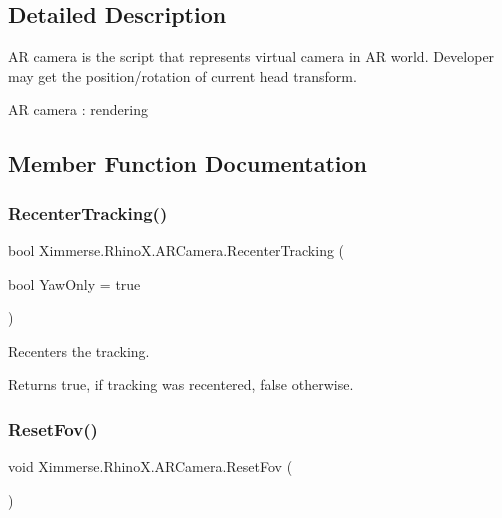 \subsection{Detailed Description}
AR camera is the script that represents virtual camera in AR world. Developer may get the position/rotation of current head transform. 

AR camera \+: rendering 

\subsection{Member Function Documentation}
\mbox{\label{class_ximmerse_1_1_rhino_x_1_1_a_r_camera_a4b8e8609b5b3c5cc7e9722be7e11caff}} 
\subsubsection{\texorpdfstring{Recenter\+Tracking()}{RecenterTracking()}}
{\footnotesize\ttfamily bool Ximmerse.\+Rhino\+X.\+A\+R\+Camera.\+Recenter\+Tracking (\begin{DoxyParamCaption}\item[{bool}]{Yaw\+Only = {\ttfamily true} }\end{DoxyParamCaption})\hspace{0.3cm}{\ttfamily [inline]}}



Recenters the tracking. 

\begin{DoxyReturn}{Returns}
{\ttfamily true}, if tracking was recentered, {\ttfamily false} otherwise.
\end{DoxyReturn}
\mbox{\label{class_ximmerse_1_1_rhino_x_1_1_a_r_camera_a8990c22f1fd7eadc81fc8cce26e307ad}} 
\subsubsection{\texorpdfstring{Reset\+Fov()}{ResetFov()}}
{\footnotesize\ttfamily void Ximmerse.\+Rhino\+X.\+A\+R\+Camera.\+Reset\+Fov (\begin{DoxyParamCaption}{ }\end{DoxyParamCaption})\hspace{0.3cm}{\ttfamily [inline]}}



